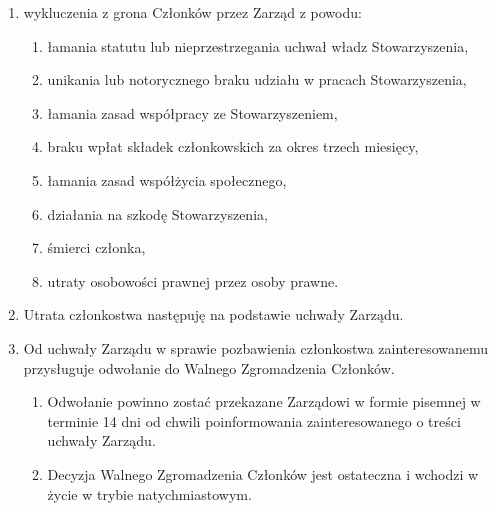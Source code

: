 \documentclass{article}
\begin{document}
\begin{enumerate}
\begin{enumerate}
        \item wykluczenia z grona Członków przez Zarząd z powodu:
          \begin{enumerate}
            \item łamania statutu lub nieprzestrzegania uchwał władz Stowarzyszenia,
            \item unikania lub notorycznego braku udziału w pracach Stowarzyszenia,
            \item łamania zasad współpracy ze Stowarzyszeniem,
            \item braku wpłat składek członkowskich za okres trzech miesięcy,
            \item łamania zasad współżycia społecznego,
            \item działania na szkodę Stowarzyszenia,
            \item śmierci członka,
            \item utraty osobowości prawnej przez osoby prawne.
          \end{enumerate}
        \item Utrata członkostwa następuję na podstawie uchwały Zarządu.
        \item Od uchwały Zarządu w sprawie pozbawienia członkostwa zainteresowanemu przysługuje odwołanie do Walnego Zgromadzenia Członków.
          \begin{enumerate}
            \item Odwołanie powinno zostać przekazane Zarządowi w formie pisemnej w terminie 14 dni od chwili poinformowania zainteresowanego o treści uchwały Zarządu.
            \item Decyzja Walnego Zgromadzenia Członków jest ostateczna i wchodzi w życie w trybie natychmiastowym.
          \end{enumerate}
      \end{enumerate}
  \end{enumerate}
\end{document}
